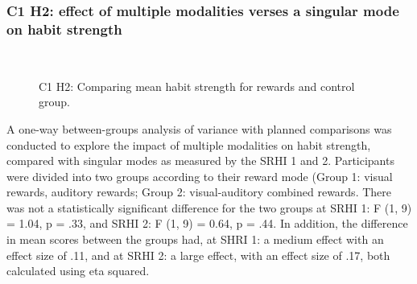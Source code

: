 \documentclass{scaffold/sigchi}
\begin{document}
\subsubsection{C1 H2: effect of multiple modalities verses a singular mode on habit strength}


\begin{figure}
  \centering
  \caption{C1 H2: Comparing mean habit strength for rewards and control group.}~\label{fig:habit_4_item_survey1_v_survey2}
\end{figure}


A one-way between-groups analysis of variance with planned comparisons was conducted to explore the
impact of multiple modalities on habit strength, compared with singular modes as measured by the SRHI 1 and 2. Participants were divided into two groups according to their reward mode (Group
1: visual rewards, auditory rewards; Group 2: visual-auditory combined rewards. There was not a
statistically significant difference for the two groups at SRHI 1: F (1, 9) = 1.04, p = .33, and SRHI 2: F (1, 9) = 0.64, p = .44. In addition, the difference in mean scores between the groups had, at SHRI 1: a medium effect with an effect size of .11, and at SRHI 2: a large effect, with an effect size of .17, both calculated using eta squared.
\end{document}
